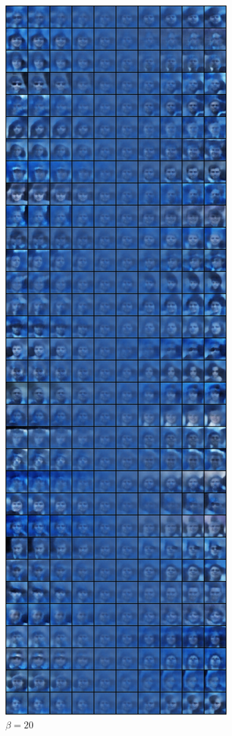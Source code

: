 \documentclass[11pt]{article}
\numberwithin{equation}{section}
\begin{document}
\begin{figure}[h]
\begin{minipage}{0.4\textwidth}
        \caption{$\beta = 0$}
    \end{minipage}
    \hspace{2cm}
    \begin{minipage}{0.4\textwidth}
        \includegraphics[width=\textwidth]{ex02/beta20.0-variation.png}
        \caption{$\beta =20$ }
    \end{minipage}
\end{figure}
\end{document}
